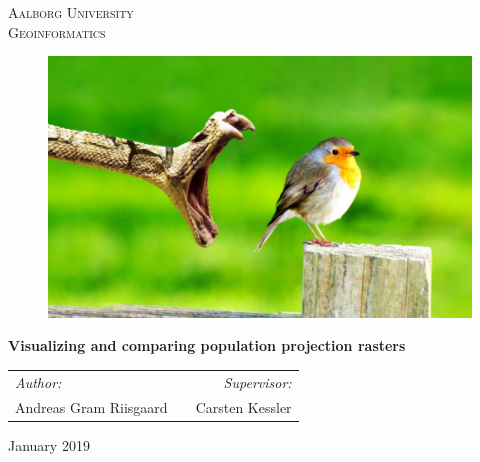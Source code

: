 \thispagestyle{empty}

\begin{center}
\textsc{\LARGE Aalborg University}\\%
\textsc{\Large Geoinformatics}\\[1.cm]
\end{center}

\begin{figure} [H]
	\centering
	\includegraphics[width=1\textwidth]{Pictures/Example.jpg}	
	\label{forside}
\end{figure}

\vfill
\begin{center}
{ \huge \bfseries {Visualizing and comparing population projection rasters}}\\[0.2cm]
\end{center}

\begin{tabularx}{\textwidth}{l X r}
	\hline
	\emph{Author:} & & \emph{Supervisor:}\\
	Andreas Gram Riisgaard	&	 &	 Carsten Kessler \\
	\hline
\end{tabularx}

\vfill

{\large January 2019}

\frontmatter

